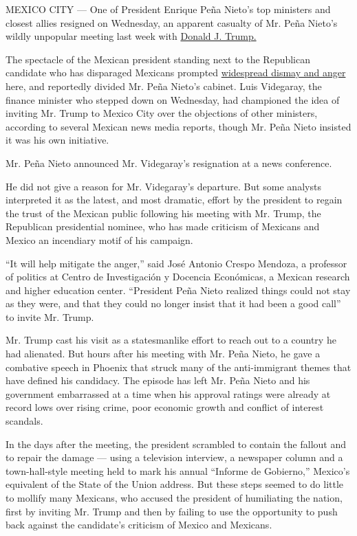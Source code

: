 MEXICO CITY --- One of President Enrique Peña Nieto's top ministers and
closest allies resigned on Wednesday, an apparent casualty of Mr. Peña
Nieto's wildly unpopular meeting last week with
\href{http://www.nytimes3xbfgragh.onion/topic/person/donald-trump}{Donald
J. Trump.}

The spectacle of the Mexican president standing next to the Republican
candidate who has disparaged Mexicans prompted
\href{http://www.nytimes3xbfgragh.onion/2016/09/01/world/americas/trump-mexico-pena-nieto-reaction.html}{widespread
dismay and anger} here, and reportedly divided Mr. Peña Nieto's cabinet.
Luis Videgaray, the finance minister who stepped down on Wednesday, had
championed the idea of inviting Mr. Trump to Mexico City over the
objections of other ministers, according to several Mexican news media
reports, though Mr. Peña Nieto insisted it was his own initiative.

Mr. Peña Nieto announced Mr. Videgaray's resignation at a news
conference.

He did not give a reason for Mr. Videgaray's departure. But some
analysts interpreted it as the latest, and most dramatic, effort by the
president to regain the trust of the Mexican public following his
meeting with Mr. Trump, the Republican presidential nominee, who has
made criticism of Mexicans and Mexico an incendiary motif of his
campaign.

``It will help mitigate the anger,'' said José Antonio Crespo Mendoza, a
professor of politics at Centro de Investigación y Docencia Económicas,
a Mexican research and higher education center. ``President Peña Nieto
realized things could not stay as they were, and that they could no
longer insist that it had been a good call'' to invite Mr. Trump.

Mr. Trump cast his visit as a statesmanlike effort to reach out to a
country he had alienated. But hours after his meeting with Mr. Peña
Nieto, he gave a combative speech in Phoenix that struck many of the
anti-immigrant themes that have defined his candidacy. The episode has
left Mr. Peña Nieto and his government embarrassed at a time when his
approval ratings were already at record lows over rising crime, poor
economic growth and conflict of interest scandals.

In the days after the meeting, the president scrambled to contain the
fallout and to repair the damage --- using a television interview, a
newspaper column and a town-hall-style meeting held to mark his annual
``Informe de Gobierno,'' Mexico's equivalent of the State of the Union
address. But these steps seemed to do little to mollify many Mexicans,
who accused the president of humiliating the nation, first by inviting
Mr. Trump and then by failing to use the opportunity to push back
against the candidate's criticism of Mexico and Mexicans.

